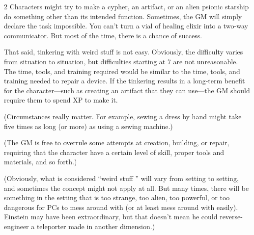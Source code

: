 \begin{multicols}{2}
Characters might try to make a cypher, an artifact, or an alien psionic starship do something other than its intended function. Sometimes, the GM will simply declare the task impossible. You can’t turn a vial of healing elixir into a two-way communicator. But most of the time, there is a chance of success. 

That said, tinkering with weird stuff is not easy. Obviously, the difficulty varies from situation to situation, but difficulties starting at 7 are not unreasonable. The time, tools, and training required would be similar to the time, tools, and training needed to repair a device. If the tinkering results in a long-term benefit for the character—such as creating an artifact that they can use—the GM should require them to spend XP to make it.

(Circumstances really matter. For example, sewing a dress by hand might take five times as long (or more) as using a sewing machine.)

(The GM is free to overrule some attempts at creation, building, or repair, requiring that the character have a certain level of skill, proper tools and materials, and so forth.)

(Obviously, what is considered “weird stuff ” will vary from setting to setting, and sometimes the concept might not apply at all. But many times, there will be something in the setting that is too strange, too alien, too powerful, or too dangerous for PCs to mess around with (or at least mess around with easily). Einstein may have been extraordinary, but that doesn’t mean he could reverse-engineer a teleporter made in another dimension.)

\end{multicols}

